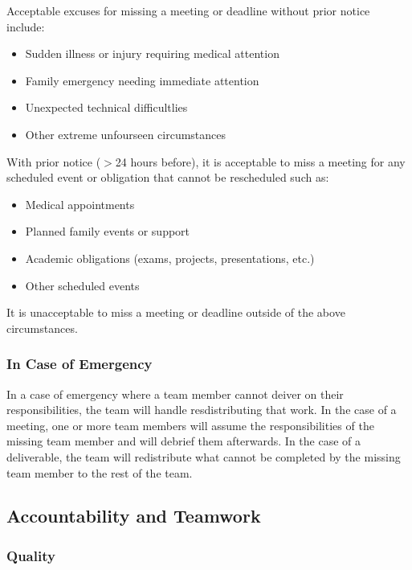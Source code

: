 \documentclass{article}
\begin{document}
Acceptable excuses for missing a meeting or deadline without prior notice include:
\begin{itemize}
  \item Sudden illness or injury requiring medical attention
  \item Family emergency needing immediate attention
  \item Unexpected technical difficultlies
  \item Other extreme unfourseen circumstances
\end{itemize}

With prior notice ($>$24 hours before), it is acceptable to miss a meeting for any scheduled event or obligation that cannot be rescheduled such as:
\begin{itemize}
  \item Medical appointments
  \item Planned family events or support
  \item Academic obligations (exams, projects, presentations, etc.)
  \item Other scheduled events
\end{itemize}

It is unacceptable to miss a meeting or deadline outside of the above circumstances.

\subsubsection*{In Case of Emergency}


In a case of emergency where a team member cannot deiver on their responsibilities, the team will handle resdistributing that work.
In the case of a meeting, one or more team members will assume the responsibilities of the missing team member and will debrief them afterwards.
In the case of a deliverable, the team will redistribute what cannot be completed by the missing team member to the rest of the team.

\subsection*{Accountability and Teamwork}

\subsubsection*{Quality} 
\end{document}
